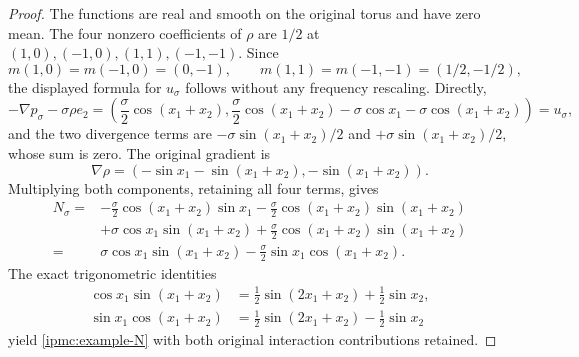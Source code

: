 \begin{proof}
The functions are real and smooth on the original torus and have zero
mean. The four nonzero coefficients of \(\rho\) are \(1/2\) at
\((1,0),(-1,0),(1,1),(-1,-1)\). Since
\[
 m(1,0)=m(-1,0)=(0,-1),\qquad
 m(1,1)=m(-1,-1)=(1/2,-1/2),
\]
the displayed formula for \(u_\sigma\) follows without any frequency
rescaling. Directly,
\[
 -\nabla p_\sigma-\sigma\rho e_2
 =\left(\frac\sigma2\cos(x_1+x_2),
         \frac\sigma2\cos(x_1+x_2)-\sigma\cos x_1
                                  -\sigma\cos(x_1+x_2)\right)
 =u_\sigma,
\]
and the two divergence terms are
\(-\sigma\sin(x_1+x_2)/2\) and
\(+\sigma\sin(x_1+x_2)/2\), whose sum is zero. The original gradient is
\[
 \nabla\rho=(-\sin x_1-\sin(x_1+x_2),-\sin(x_1+x_2)).
\]
Multiplying both components, retaining all four terms, gives
\begin{align*}
 N_\sigma
 ={}&-\frac\sigma2\cos(x_1+x_2)\sin x_1
      -\frac\sigma2\cos(x_1+x_2)\sin(x_1+x_2)\\
    &+\sigma\cos x_1\sin(x_1+x_2)
      +\frac\sigma2\cos(x_1+x_2)\sin(x_1+x_2)\\
 ={}&\sigma\cos x_1\sin(x_1+x_2)
       -\frac\sigma2\sin x_1\cos(x_1+x_2).
\end{align*}
The exact trigonometric identities
\begin{align*}
 \cos x_1\sin(x_1+x_2)
     &=\frac12\sin(2x_1+x_2)+\frac12\sin x_2,\\
 \sin x_1\cos(x_1+x_2)
     &=\frac12\sin(2x_1+x_2)-\frac12\sin x_2
\end{align*}
yield \eqref{ipmc:example-N} with both original interaction contributions retained.


\end{proof}
